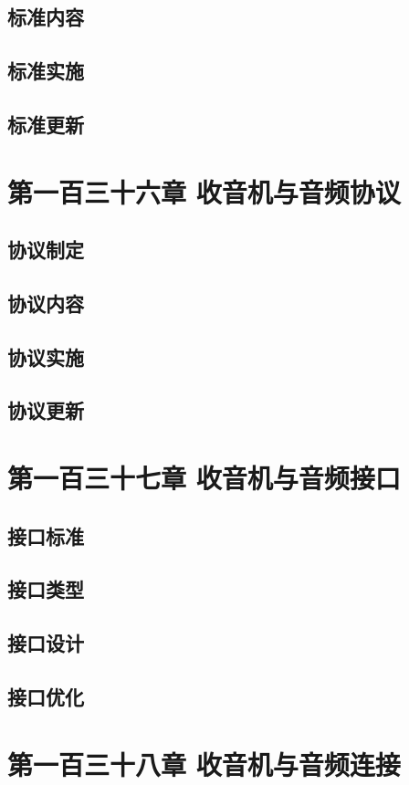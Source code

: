 \documentclass[12pt,UTF8]{ctexbook}
\begin{document}
\section{标准内容}
\section{标准实施}
\section{标准更新}

\chapter{第一百三十六章 收音机与音频协议}

\section{协议制定}
\section{协议内容}
\section{协议实施}
\section{协议更新}

\chapter{第一百三十七章 收音机与音频接口}

\section{接口标准}
\section{接口类型}
\section{接口设计}
\section{接口优化}

\chapter{第一百三十八章 收音机与音频连接}
\end{document}
